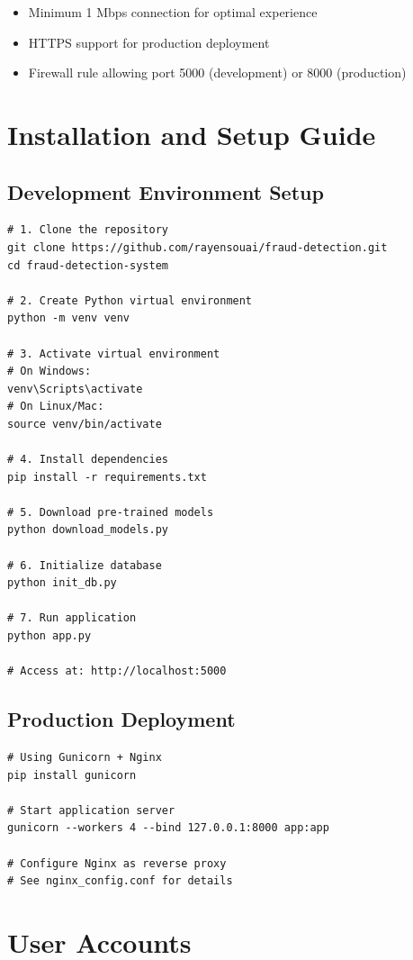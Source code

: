 \documentclass[12pt,a4paper,twoside]{report}
\begin{document}
\begin{itemize}
    \item Minimum 1 Mbps connection for optimal experience
    \item HTTPS support for production deployment
    \item Firewall rule allowing port 5000 (development) or 8000 (production)
\end{itemize}

\section{Installation and Setup Guide}

\subsection{Development Environment Setup}

\begin{verbatim}
# 1. Clone the repository
git clone https://github.com/rayensouai/fraud-detection.git
cd fraud-detection-system

# 2. Create Python virtual environment
python -m venv venv

# 3. Activate virtual environment
# On Windows:
venv\Scripts\activate
# On Linux/Mac:
source venv/bin/activate

# 4. Install dependencies
pip install -r requirements.txt

# 5. Download pre-trained models
python download_models.py

# 6. Initialize database
python init_db.py

# 7. Run application
python app.py

# Access at: http://localhost:5000
\end{verbatim}

\subsection{Production Deployment}

\begin{verbatim}
# Using Gunicorn + Nginx
pip install gunicorn

# Start application server
gunicorn --workers 4 --bind 127.0.0.1:8000 app:app

# Configure Nginx as reverse proxy
# See nginx_config.conf for details
\end{verbatim}

\section{User Accounts}
\end{document}

